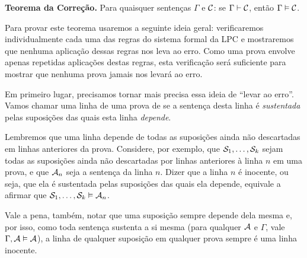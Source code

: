 \begin{factoidboxe}\textbf
	{Teorema da Correção.} Para quaisquer sentenças $\Gamma$ e $\mathcal{C}$: se $\Gamma\vdash\mathcal{C}$, então $\Gamma \vDash\mathcal{C}$.
\end{factoidboxe}

Para provar este teorema usaremos a seguinte ideia geral:
verificaremos individualmente cada uma das regras do sistema formal da LPC e mostraremos que nenhuma aplicação dessas regras nos leva ao erro.
Como uma prova envolve apenas repetidas aplicações destas regras, esta verificação será suficiente para mostrar que nenhuma prova jamais nos levará ao erro.

Em primeiro lugar, precisamos tornar mais precisa essa ideia de ``levar ao erro''.
Vamos chamar uma linha de uma prova de  se a sentença desta linha é \textit{sustentada} pelas suposições das quais esta linha \textit{depende}.

Lembremos que uma linha depende de todas as suposições ainda não descartadas em linhas anteriores da prova.
Considere, por exemplo, que $\mathcal{S}_1, \ldots, \mathcal{S}_k$ sejam todas as suposições ainda não descartadas por linhas anteriores à linha $n$ em uma prova, e que $\mathcal{A}_n$ seja a sentença da linha $n$.
Dizer que a linha $n$ é inocente, ou seja, que ela é sustentada pelas suposições das quais ela depende, equivale a afirmar que $\mathcal{S}_1, \ldots, \mathcal{S}_k \vDash \mathcal{A}_n$.

Vale a pena, também, notar que uma suposição sempre depende dela mesma e, por isso, como toda sentença sustenta a si mesma (para qualquer $\mathcal{A}$ e $\Gamma$, vale $\Gamma, \mathcal{A} \vDash \mathcal{A}$), a linha de qualquer suposição em qualquer prova sempre é uma linha inocente.

